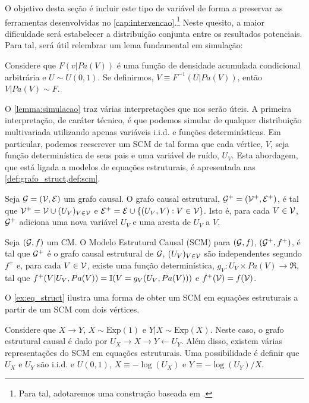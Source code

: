 O objetivo desta seção é 
incluir este tipo de variável de forma
a preservar as ferramentas desenvolvidas
no \cref{cap:intervencao}.\footnote{
 Para tal, adotaremos uma construção
 baseada em \citet{Galles1998}.
}
Neste quesito, a maior dificuldade será
estabelecer a distribuição conjunta
entre os resultados potenciais.
Para tal, será útil relembrar
um lema fundamental em simulação:

\begin{lemma}
 \label{lemma:simulacao}
 Considere que $F(v|Pa(V))$ é
 uma função de densidade acumulada condicional arbitrária e
 $U \sim U(0,1)$. Se definirmos,
 $V \equiv F^{-1}(U|Pa(V))$, então
 $V|Pa(V) \sim F$.
\end{lemma}

O \cref{lemma:simulacao} traz 
várias interpretações que nos serão úteis.
A primeira interpretação, de caráter técnico, é 
que podemos simular de 
qualquer distribuição multivariada utilizando apenas
variáveis i.i.d. e funções determinísticas.
Em particular, podemos 
reescrever um SCM de tal forma que
cada vértice, $V$, seja função determinística
de seus pais e uma variável de ruído, $U_V$.
Esta abordagem, que está ligada a
modelos de equações estruturais, é
apresentada nas \cref{def:grafo_struct,def:scm}.

\begin{definition}
 \label{def:grafo_struct}
 Seja ${\mathcal G} = ({\mathcal V}, {\mathcal E})$ um grafo causal.
 O grafo causal estrutural,
 ${\mathcal G}^+ = ({\mathcal V}^+, {\mathcal E}^+)$, é tal que 
 ${\mathcal V}^+ = {\mathcal V} \cup (U_V)_{V \in {\mathcal V}}$ e
 ${\mathcal E}^+ = {\mathcal E} \cup \{(U_V, V): V \in {\mathcal V}\}$.
 Isto é, para cada $V \in {\mathcal V}$, 
 ${\mathcal G}^+$ adiciona uma nova variável $U_V$ e
 uma aresta de $U_V$ a $V$.
\end{definition} 
 
\begin{definition}
 \label{def:scm}
 Seja $({\mathcal G},f)$ um CM.
 O Modelo Estrutural Causal (SCM) para $({\mathcal G},f)$, 
 $({\mathcal G}^+,f^+)$, é tal que
 ${\mathcal G}^+$ é o grafo causal estrutural de ${\mathcal G}$,
 $(U_V)_{V \in {\mathcal V}}$ são independentes segundo $f^+$ e,
 para cada $V \in {\mathcal V}$, existe uma função determinística, 
 $g_V: U_V \times Pa(V) \rightarrow \Re$,
 tal que $f^+(V|U_V,Pa(V)) = {\mathbb I}(V = g_V(U_V, Pa(V)))$ e
 $f^+({\mathcal V}) = f({\mathcal V})$.
\end{definition}
 
O \cref{ex:eq_struct} ilustra
uma forma de obter 
um SCM em equações estruturais
a partir de um SCM com dois vértices.
 
\begin{example}
 \label{ex:eq_struct}
 Considere que $X \rightarrow Y$,
 $X \sim \text{Exp}(1)$ e $Y|X \sim \text{Exp}(X)$.
 Neste caso, o grafo estrutural causal é
 dado por $U_X \rightarrow X \rightarrow Y \leftarrow U_Y$.
 Além disso, existem várias representações do SCM
 em equações estruturais. Uma possibilidade é
 definir que $U_X$ e $U_Y$ são i.i.d. e $U(0,1)$,
 $X \equiv -\log(U_X)$ e $Y \equiv -\log(U_Y)/X$.
\end{example}
 
